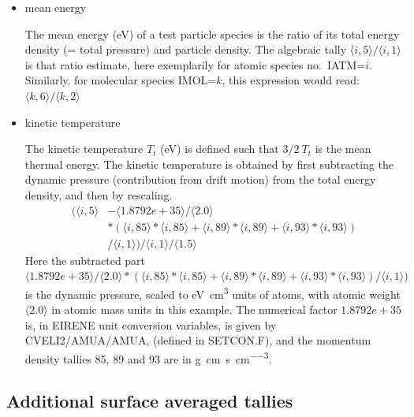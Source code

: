 \begin{itemize}
  \item{mean energy} ~

        The mean energy (\si{\electronvolt}) of a test particle species is the ratio of
        its total energy density (= total pressure) and particle density.
        The algebraic tally $\langle i,5\rangle/\langle i,1\rangle$ is that ratio
        estimate, here exemplarily for atomic species no.\ IATM=$i$.
        Similarly, for molecular species IMOL=$k$, this expression would read:
        $\langle k,6\rangle/\langle k,2\rangle$

  \item{kinetic temperature} ~

        The kinetic temperature $T_t$ (\si{\electronvolt})  is defined such that $3/2
          \ T_t$ is the mean thermal energy.
        The kinetic temperature is obtained by first subtracting the dynamic pressure
        (contribution from drift motion) from the total energy density, and then by
        rescaling.
        \begin{align}
          \nonumber
          (\langle i,5\rangle & -\langle 1.8792e+35\rangle/\langle 2.0\rangle
          \\
                              & *(\langle i,85 \rangle*\langle
          i,85\rangle+\langle i,89\rangle*\langle i,89\rangle+\langle i,93\rangle*\langle
          i,93\rangle)                                                          \\
                              & /\langle i,1\rangle)/\langle i,1\rangle/\langle
          1.5\rangle
        \end{align}
        Here the subtracted part $\langle 1.8792e+35\rangle/\langle 2.0\rangle*
          (\langle i,85\rangle*\langle i,85\rangle+ \langle i,89\rangle*\langle
          i,89\rangle+ \langle i,93\rangle*\langle i,93\rangle)/ \langle i,1\rangle)$ is
        the dynamic pressure, scaled to \si{\electronvolt\cubic\centi\metre} units of
        atoms, with atomic weight $\langle 2.0\rangle$ in atomic mass units in this
        example.
        The numerical factor $1.8792e+35$ is, in EIRENE unit conversion variables, is
        given by CVELI2/AMUA/AMUA, (defined in SETCON.F), and the momentum density
        tallies 85, 89 and 93 are in
        \si{\gram\centi\metre\per\second\per\cubic\centi\metre}.
\end{itemize}

\subsection{Additional surface averaged tallies}\label{sec2.10E}

